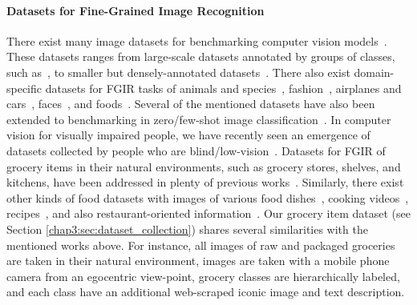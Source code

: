 \vspace{-3mm}
\paragraph{Datasets for Fine-Grained Image Recognition}
There exist many image datasets for benchmarking computer vision models~\cite{deng2009imagenet, nilsback2008automated, wah2011cub, krizhevsky2009learning, lin2014microsoft, van2018inaturalist, massiceti2021orbit, barbu2019objectnet}. These datasets ranges from large-scale datasets annotated by groups of classes, such as~\cite{deng2009imagenet, openimages}, to smaller but densely-annotated datasets~\cite{everingham2010pascal, lin2014microsoft, krishna2017visual, gupta2019lvis}. There also exist domain-specific datasets for FGIR tasks of animals and species~\cite{van2018inaturalist, van2021benchmarking, khosla2011stanforddogs, van2015building, parkhi12a, lampert2009learning}, fashion~\cite{liu2016deepfashion, jia2020fashionpedia}, airplanes and cars~\cite{vedaldi2014understanding, maji2013fine, krause20133d, yang2015large, gebru2017fine}, faces~\cite{parkhi2015deep, huang2008labeled, cao2018vggface2, guo2016ms}, and foods~\cite{hou2017vegfru, bossard2014food}. Several of the mentioned datasets have also been extended to benchmarking in zero/few-shot image classification~\cite{lampert2013attribute, reed2016learning, triantafillou2019meta, bujwid2021large}. In computer vision for visually impaired people, we have recently seen an emergence of datasets collected by people who are blind/low-vision~\cite{kacorri2017teachable, gurari2018vizwiz, sosa2017hands, massiceti2021orbit, gurari2019vizwiz}. Datasets for FGIR of grocery items in their natural environments, such as grocery stores, shelves, and kitchens, have been addressed in plenty of previous works~\cite{jund2016freiburg, waltner2015mango, george2014recognizing, merler2007recognizing, geng2018fine, wei2019rpc}. Similarly, there exist other kinds of food datasets with images of various food dishes~\cite{bossard2014food, kawano2014automatic, min2019ingredient, rich2016towards}, cooking videos~\cite{damen2018scaling, damen2021rescaling}, recipes~\cite{marin2019learning, salvador2017learning, yagcioglu2018recipeqa}, and also restaurant-oriented information~\cite{beijbom2015menu, xu2015geolocalized}. Our grocery item dataset (see Section \ref{chap3:sec:dataset_collection}) shares several similarities with the mentioned works above. For instance, all images of raw and packaged groceries are taken in their natural environment, images are taken with a mobile phone camera from an egocentric view-point, grocery classes are hierarchically labeled, and each class have an additional web-scraped iconic image and text description.


